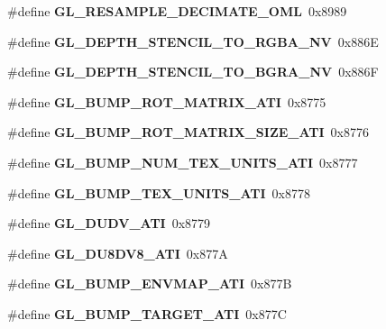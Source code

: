 \begin{DoxyCompactItemize}
\item 
\#define {\bfseries G\+L\+\_\+\+R\+E\+S\+A\+M\+P\+L\+E\+\_\+\+D\+E\+C\+I\+M\+A\+T\+E\+\_\+\+O\+M\+L}~0x8989\label{_s_d_l__opengl_8h_a9dd241ee43db832e8dce321753e66273}

\item 
\#define {\bfseries G\+L\+\_\+\+D\+E\+P\+T\+H\+\_\+\+S\+T\+E\+N\+C\+I\+L\+\_\+\+T\+O\+\_\+\+R\+G\+B\+A\+\_\+\+N\+V}~0x886\+E\label{_s_d_l__opengl_8h_ac39eca34947d78670cc67f00d89f25f1}

\item 
\#define {\bfseries G\+L\+\_\+\+D\+E\+P\+T\+H\+\_\+\+S\+T\+E\+N\+C\+I\+L\+\_\+\+T\+O\+\_\+\+B\+G\+R\+A\+\_\+\+N\+V}~0x886\+F\label{_s_d_l__opengl_8h_af58b87cc77c862953ed02f2c0577fa59}

\item 
\#define {\bfseries G\+L\+\_\+\+B\+U\+M\+P\+\_\+\+R\+O\+T\+\_\+\+M\+A\+T\+R\+I\+X\+\_\+\+A\+T\+I}~0x8775\label{_s_d_l__opengl_8h_a77423d183c0ab47e933a7ee52de91e15}

\item 
\#define {\bfseries G\+L\+\_\+\+B\+U\+M\+P\+\_\+\+R\+O\+T\+\_\+\+M\+A\+T\+R\+I\+X\+\_\+\+S\+I\+Z\+E\+\_\+\+A\+T\+I}~0x8776\label{_s_d_l__opengl_8h_a1861eb8f13e611587312f9d92912fcc9}

\item 
\#define {\bfseries G\+L\+\_\+\+B\+U\+M\+P\+\_\+\+N\+U\+M\+\_\+\+T\+E\+X\+\_\+\+U\+N\+I\+T\+S\+\_\+\+A\+T\+I}~0x8777\label{_s_d_l__opengl_8h_a7f2d7d8bcbecb67b568d9d0e6ee1a344}

\item 
\#define {\bfseries G\+L\+\_\+\+B\+U\+M\+P\+\_\+\+T\+E\+X\+\_\+\+U\+N\+I\+T\+S\+\_\+\+A\+T\+I}~0x8778\label{_s_d_l__opengl_8h_a20a1835bb5bf76a8c2908d1088cc135b}

\item 
\#define {\bfseries G\+L\+\_\+\+D\+U\+D\+V\+\_\+\+A\+T\+I}~0x8779\label{_s_d_l__opengl_8h_a4fd72382f5d3963b366eeff6466b3df2}

\item 
\#define {\bfseries G\+L\+\_\+\+D\+U8\+D\+V8\+\_\+\+A\+T\+I}~0x877\+A\label{_s_d_l__opengl_8h_afc066152583a53c75a16a64d7c53ca61}

\item 
\#define {\bfseries G\+L\+\_\+\+B\+U\+M\+P\+\_\+\+E\+N\+V\+M\+A\+P\+\_\+\+A\+T\+I}~0x877\+B\label{_s_d_l__opengl_8h_a1ba18a5050a1594fe69dccd7371056bd}

\item 
\#define {\bfseries G\+L\+\_\+\+B\+U\+M\+P\+\_\+\+T\+A\+R\+G\+E\+T\+\_\+\+A\+T\+I}~0x877\+C\label{_s_d_l__opengl_8h_a6ac2d3730e4b2511f42c69090fc8822b}


\end{DoxyCompactItemize}
